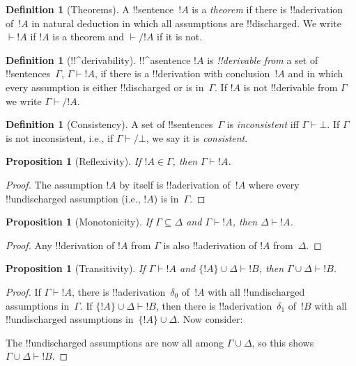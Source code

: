 \documentclass[10pt,a4paper]{article}
\theoremstyle{plain}
\newtheorem{prop}[thm]{Proposition}
\theoremstyle{definition}
\newtheorem{defn}[thm]{Definition}
\theoremstyle{remark}
\newcommand*{\ollabel}[1]{\label{#1}}
\providecommand{\AxiomC}[1]{}
\providecommand{\UnaryInfC}[1]{}
\providecommand{\BinaryInfC}[1]{}
\providecommand{\RightLabel}[1]{}
\newenvironment{prooftree}{}{}
\providecommand{\lif}{\mathbin{\rightarrow}}
\providecommand{\lfalse}{\bot}
\providecommand{\Proves}{\mathrel{\vdash}}
\providecommand{\Elim}[1]{}
\providecommand{\Intro}[1]{}
\providecommand{\Discharge}{\mathrm{Dis}}
\providecommand{\Intro}{\mathrm{I}}
\begin{document}
\begin{defn}[Theorems]
A !!{sentence}~$!A$ is a \emph{theorem} if there is !!a{derivation}
of~$!A$ in natural deduction in which all assumptions are
!!{discharged}.  We write $\Proves !A$ if $!A$ is a theorem and
$\Proves/ !A$ if it is not.
\end{defn}

\begin{defn}[!!^{derivability}]
!!^a{sentence} $!A$ is \emph{!!{derivable} from} a set of
!!{sentence}s~$\Gamma$, $\Gamma \Proves !A$, if there is a
!!{derivation} with conclusion~$!A$ and in which every assumption
is either !!{discharged} or is in~$\Gamma$. If $!A$ is not
!!{derivable} from $\Gamma$ we write $\Gamma \Proves/ !A$.
\end{defn}

\begin{defn}[Consistency]
A set of !!{sentence}s~$\Gamma$ is \emph{inconsistent} iff $\Gamma
\Proves \lfalse$.  If $\Gamma$ is not inconsistent, i.e., if
$\Gamma \Proves/ \lfalse$, we say it is \emph{consistent}.
\end{defn}

\begin{prop}[Reflexivity]
\ollabel{prop:reflexivity}
If $!A \in \Gamma$, then $\Gamma \Proves !A$.
\end{prop}

\begin{proof}
The assumption $!A$ by itself is !!a{derivation} of~$!A$ where every
!!{undischarged} assumption (i.e., $!A$) is in~$\Gamma$.
\end{proof}
  

\begin{prop}[Monotonicity]
\ollabel{prop:monotonicity}
If $\Gamma \subseteq \Delta$ and $\Gamma \Proves !A$, then $\Delta
\Proves !A$.
\end{prop}

\begin{proof}
Any !!{derivation} of $!A$ from $\Gamma$ is also !!a{derivation} of
$!A$ from~$\Delta$.
\end{proof}

\begin{prop}[Transitivity]
\ollabel{prop:transitivity}
If $\Gamma \Proves !A$ and $\{!A\} \cup \Delta \Proves
!B$, then $\Gamma \cup \Delta \Proves !B$.
\end{prop}

\begin{proof}
If $\Gamma \Proves !A$, there is !!a{derivation}~$\delta_0$ of~$!A$
with all !!{undischarged} assumptions in~$\Gamma$.  If $\{!A\} \cup
\Delta \Proves !B$, then there is !!a{derivation}~$\delta_1$ of~$!B$
with all !!{undischarged} assumptions in~$\{!A\} \cup \Delta$.
Now consider:
\begin{prooftree}
  \AxiomC{$\Delta, \Discharge{!A}{1}$}
  \RightLabel{$\delta_1$}
  \DischargeRule{\Intro{\lif}}{1}
  \UnaryInfC{$!A \lif !B$}
  \AxiomC{$\Gamma$}
  \RightLabel{$\delta_0$}
  \RightLabel{\Elim{\lif}}
  \BinaryInfC{$!B$}
\end{prooftree}
The !!{undischarged} assumptions are now all among $\Gamma \cup
\Delta$, so this shows $\Gamma \cup \Delta \Proves !B$.
\end{proof}
\end{document}
